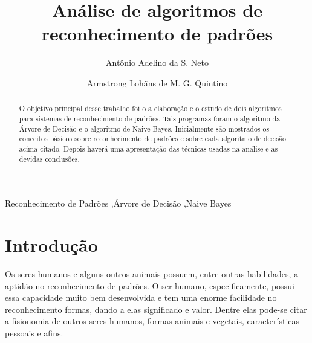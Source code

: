 \documentclass[preprint,12pt,times]{elsarticle}
\begin{document}
	
	\begin{frontmatter}
		
		
		
		\title{Análise de algoritmos de reconhecimento de padrões}
				
		\author[a]{Antônio Adelino da S. Neto}
		\address[a]{antonio.asn03@gmail.com}
		
		\author[b]{Armstrong Lohãns de M. G. Quintino}
		\address[b]{lohansdemelo1108@gmail.com}
		
		\address{Garanhuns, Brasil}
		
		\begin{abstract}
			O objetivo principal desse trabalho foi o a elaboração e o estudo de dois algoritmos para sistemas de reconhecimento de padrões. Tais programas foram o algoritmo da Árvore de Decisão e o algoritmo de Naive Bayes. Inicialmente são mostrados os conceitos básicos sobre reconhecimento de padrões e sobre cada algoritmo de decisão acima citado. Depois haverá uma apresentação das técnicas usadas na análise e as devidas conclusões.
		\end{abstract}
		
		\begin{keyword}
			Reconhecimento de Padrões \sep Árvore de Decisão \sep Naive Bayes
		\end{keyword}
		
	\end{frontmatter}
	
	\linenumbers
	
	\section{Introdução}
	\label{Introdução}
	Os seres humanos e alguns outros animais possuem, entre outras habilidades, a aptidão no reconhecimento de padrões. O ser humano, especificamente, possui essa capacidade muito bem desenvolvida e tem uma enorme facilidade no reconhecimento formas, dando a elas significado e valor. Dentre elas pode-se citar a fisionomia de outros seres humanos, formas animais e vegetais, características pessoais e afins.
	
\end{document}
